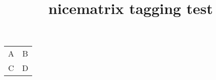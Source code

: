 \documentclass{article}
\title{nicematrix tagging test}
\begin{document}
\begin{NiceTabular}{cc}
A & B \\
C & D
\end{NiceTabular}
\end{document}
